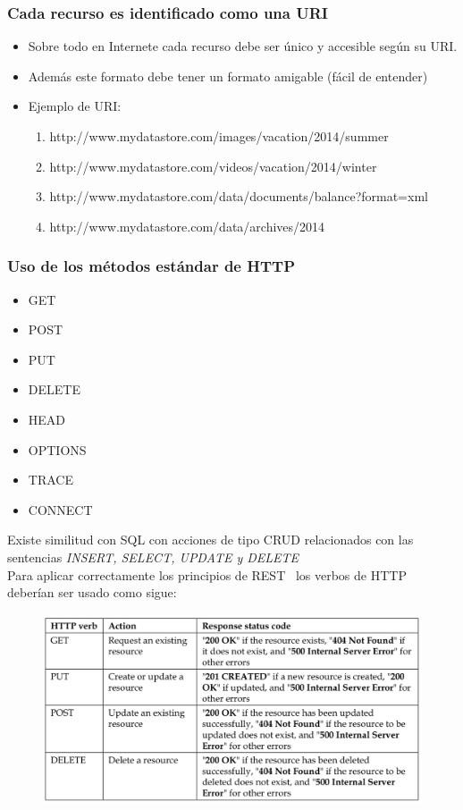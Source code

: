 \documentclass[4paper]{article}
\newcommand{\R}{REST}
\begin{document}
\subsubsection{Cada recurso es identificado como una URI}
\begin{itemize}
\item Sobre todo en Internete cada recurso debe ser único y accesible según su URI.
\item Además este formato debe tener un formato amigable (fácil de entender)
\item Ejemplo de URI:
\begin{enumerate}
\item http://www.mydatastore.com/images/vacation/2014/summer
\item http://www.mydatastore.com/videos/vacation/2014/winter
\item http://www.mydatastore.com/data/documents/balance?format=xml
\item http://www.mydatastore.com/data/archives/2014
\end{enumerate}
\end{itemize}

\subsubsection{Uso de los métodos estándar de HTTP}
\begin{itemize}
\item GET
\item POST
\item PUT
\item DELETE
\item HEAD
\item OPTIONS
\item TRACE
\item CONNECT
\end{itemize}
Existe similitud con SQL con acciones de tipo CRUD relacionados con las sentencias \emph{INSERT, SELECT, UPDATE y DELETE}\\
Para aplicar correctamente los principios de \R ~ los verbos de HTTP deberían ser usado como sigue:
\begin{figure}[H]
\includegraphics[scale=0.4]{../imagenes/rest.png}
\end{figure}
\end{document}
